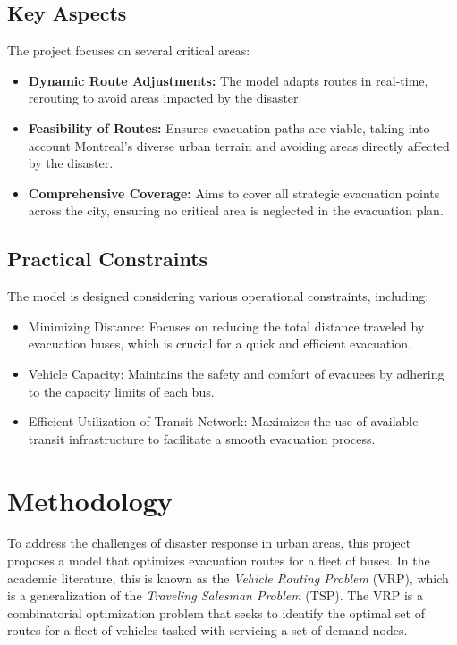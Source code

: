 \documentclass[12pt]{article}
\begin{document}
\subsection{Key Aspects}

The project focuses on several critical areas:
\begin{itemize}
    \item \textbf{Dynamic Route Adjustments:} The model adapts routes in real-time, rerouting to avoid areas impacted by the disaster.
    \item \textbf{Feasibility of Routes:} Ensures evacuation paths are viable, taking into account Montreal’s diverse urban terrain and avoiding areas directly affected by the disaster.
    \item \textbf{Comprehensive Coverage:} Aims to cover all strategic evacuation points across the city, ensuring no critical area is neglected in the evacuation plan.
\end{itemize}

\subsection{Practical Constraints}

The model is designed considering various operational constraints, including:
\begin{itemize}
    \item Minimizing Distance: Focuses on reducing the total distance traveled by evacuation buses, which is crucial for a quick and efficient evacuation.
    \item Vehicle Capacity: Maintains the safety and comfort of evacuees by adhering to the capacity limits of each bus.
    \item Efficient Utilization of Transit Network: Maximizes the use of available transit infrastructure to facilitate a smooth evacuation process.
\end{itemize}

\section{Methodology}
To address the challenges of disaster response in urban areas, this project proposes a model that optimizes evacuation routes for a fleet of buses.
In the academic literature, this is known as the \textit{Vehicle Routing Problem} (VRP), which is a generalization of the \textit{Traveling Salesman Problem} (TSP).
The VRP is a combinatorial optimization problem that seeks to identify the optimal set of routes for a fleet of vehicles tasked with servicing a set of demand nodes.
\end{document}
